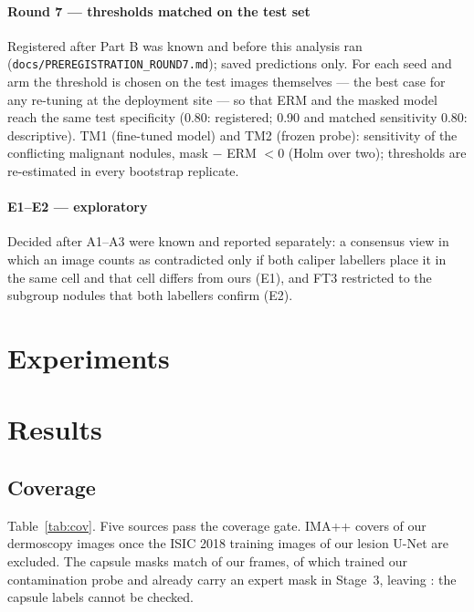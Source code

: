 \paragraph{Round 7 --- thresholds matched on the test set} Registered after Part B was known and before this analysis
ran (\texttt{docs/PREREGISTRATION\_ROUND7.md}); saved predictions only. For each seed and arm the threshold is chosen on
the test images themselves --- the best case for any re-tuning at the deployment site --- so that ERM and the masked model
reach the same test specificity (0.80: registered; 0.90 and matched sensitivity 0.80: descriptive). TM1 (fine-tuned model)
and TM2 (frozen probe): sensitivity of the \sEightSubN{} conflicting malignant nodules, mask $-$ ERM $<0$ (Holm over two);
thresholds are re-estimated in every bootstrap replicate.
\paragraph{E1--E2 --- exploratory} Decided after A1--A3 were known and reported separately: a consensus view in which an
image counts as contradicted only if both caliper labellers place it in the same cell and that cell differs from ours
(E1), and FT3 restricted to the subgroup nodules that both labellers confirm (E2).

\section{Experiments}


\section{Results}
\subsection{Coverage}
Table~\ref{tab:cov}. Five sources pass the coverage gate. IMA++ covers \sEightNIma{} of our dermoscopy images once the
\sEightImaExcl{} ISIC 2018 training images of our lesion U-Net are excluded. The capsule masks match \sEightCapBefore{} of
our frames, of which \sEightCapProbe{} trained our contamination probe and \sEightCapExpert{} already carry an expert mask
in Stage~3, leaving \sEightNCap: the capsule labels cannot be checked.


